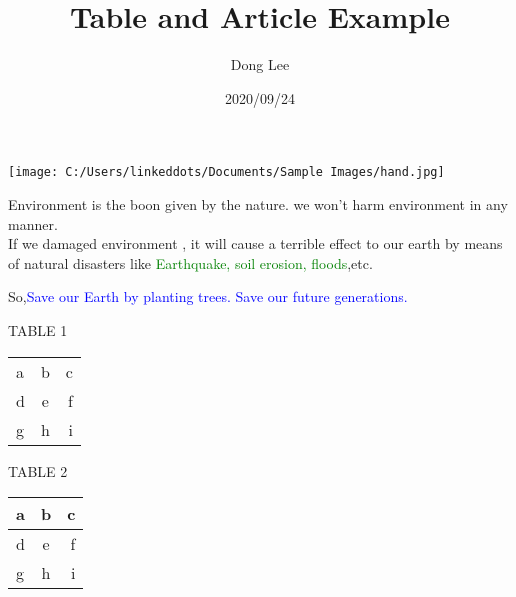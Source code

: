 \documentclass[a4paper,12pt]{article}
\title{Table and Article Example}
\author{Dong Lee}
\date{2020/09/24}
\begin{document}
\textcolor{red}{\maketitle}

\begin{center}
  \texttt{[image: C:/Users/linkeddots/Documents/Sample Images/hand.jpg]}
\end{center}

Environment is the boon given by the nature. we won't harm environment in any manner. \\
If we damaged environment , it will cause a terrible effect to our earth by means of natural 
disasters like \textcolor{green}{Earthquake, soil erosion, floods},\quad etc.

So,\textcolor{blue} {Save our Earth by planting trees. Save our future generations.}



\newpage

\begin{center}

TABLE 1

\end{center}

\begin{tabular}{lcr}

a&b&c\\
d&e&f\\
g&h&i

\end{tabular}

\begin{center}
TABLE 2

\begin{tabular}{|l|c|r|}

\hline
a&b&c\\ \hline
d&e&f\\ \hline
g&h&i\\ \hline

\end{tabular}

%

\end{center}
\end{document}
